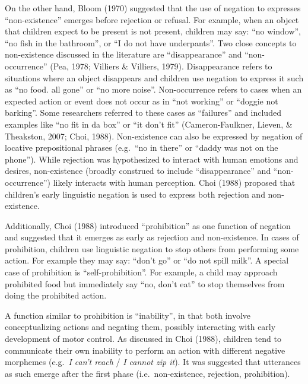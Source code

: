 \documentclass[10pt, letterpaper]{article}
\begin{document}
On the other hand, Bloom (1970) suggested that the use of negation to
expresses ``non-existence'' emerges before rejection or refusal. For
example, when an object that children expect to be present is not
present, children may say: ``no window'', ``no fish in the bathroom'',
or ``I do not have underpants''. Two close concepts to non-existence
discussed in the literature are ``disappearance'' and ``non-occurrence''
(Pea, 1978; Villiers \& Villiers, 1979). Disappearance refers to
situations where an object disappears and children use negation to
express it such as ``no food. all gone'' or ``no more noise''.
Non-occurrence refers to cases when an expected action or event does not
occur as in ``not working'' or ``doggie not barking''. Some researchers
referred to these cases as ``failures'' and included examples like ``no
fit in da box'' or ``it don't fit'' (Cameron-Faulkner, Lieven, \&
Theakston, 2007; Choi, 1988). Non-existence can also be expressed by
negation of locative prepositional phrases (e.g.~``no in there'' or
``daddy was not on the phone''). While rejection was hypothesized to
interact with human emotions and desires, non-existence (broadly
construed to include ``disappearance'' and ``non-occurrence'') likely
interacts with human perception. Choi (1988) proposed that children's
early linguistic negation is used to express both rejection and
non-existence.

Additionally, Choi (1988) introduced ``prohibition'' as one function of
negation and suggested that it emerges as early as rejection and
non-existence. In cases of prohibition, children use linguistic negation
to stop others from performing some action. For example they may say:
``don't go'' or ``do not spill milk''. A special case of prohibition is
``self-prohibition''. For example, a child may approach prohibited food
but immediately say ``no, don't eat'' to stop themselves from doing the
prohibited action.

A function similar to prohibition is ``inability'', in that both involve
conceptualizing actions and negating them, possibly interacting with
early development of motor control. As discussed in Choi (1988),
children tend to communicate their own inability to perform an action
with different negative morphemes (e.g.~\emph{I can't reach} / \emph{I
cannot zip it}). It was suggested that utterances as such emerge after
the first phase (i.e.~non-existence, rejection, prohibition).
\end{document}
